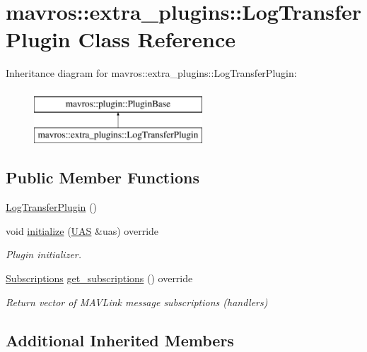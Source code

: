 \hypertarget{classmavros_1_1extra__plugins_1_1LogTransferPlugin}{}\section{mavros\+::extra\+\_\+plugins\+::Log\+Transfer\+Plugin Class Reference}
\label{classmavros_1_1extra__plugins_1_1LogTransferPlugin}
Inheritance diagram for mavros\+::extra\+\_\+plugins\+::Log\+Transfer\+Plugin\+:\begin{figure}[H]
\begin{center}
\leavevmode
\includegraphics[height=2.000000cm]{classmavros_1_1extra__plugins_1_1LogTransferPlugin}
\end{center}
\end{figure}
\subsection*{Public Member Functions}
\begin{DoxyCompactItemize}
\item 
\mbox{\hyperlink{classmavros_1_1extra__plugins_1_1LogTransferPlugin_aa49c2822d7de52b2dcc545e300dadc55}{Log\+Transfer\+Plugin}} ()
\item 
void \mbox{\hyperlink{classmavros_1_1extra__plugins_1_1LogTransferPlugin_a9b51f52d0ba0538c8dc08b79e35b42f8}{initialize}} (\mbox{\hyperlink{classmavros_1_1UAS}{U\+AS}} \&uas) override
\begin{DoxyCompactList}\small\item\em Plugin initializer. \end{DoxyCompactList}\item 
\mbox{\hyperlink{group__plugin_ga8967d61fc77040e0c3ea5a4585d62a09}{Subscriptions}} \mbox{\hyperlink{classmavros_1_1extra__plugins_1_1LogTransferPlugin_a3aa5677fcfe97c13bd7d940345290aa6}{get\+\_\+subscriptions}} () override
\begin{DoxyCompactList}\small\item\em Return vector of M\+A\+V\+Link message subscriptions (handlers) \end{DoxyCompactList}\end{DoxyCompactItemize}
\subsection*{Additional Inherited Members}


